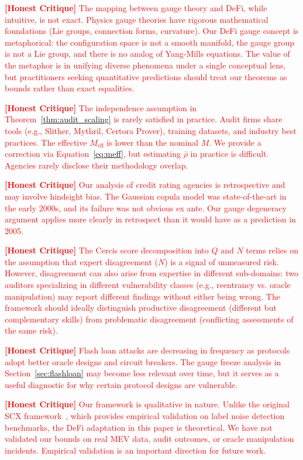 \documentclass[12pt,a4paper]{article}
\theoremstyle{remark}
\newcommand{\Cercis}{\textsf{Cercis}}
\newcommand{\honestcrit}[1]{\textcolor{red}{\textbf{[Honest Critique]} #1}}
\begin{document}
\honestcrit{The mapping between gauge theory and DeFi, while intuitive, is
not exact. Physics gauge theories have rigorous mathematical foundations
(Lie groups, connection forms, curvature). Our DeFi gauge concept is
metaphorical: the configuration space is not a smooth manifold, the gauge
group is not a Lie group, and there is no analog of Yang-Mills equations.
The value of the metaphor is in unifying diverse phenomena under a single
conceptual lens, but practitioners seeking quantitative predictions should
treat our theorems as bounds rather than exact equalities.}

\honestcrit{The independence assumption in Theorem~\ref{thm:audit_scaling} is
rarely satisfied in practice. Audit firms share tools (e.g., Slither, Mythril,
Certora Prover), training datasets, and industry best practices. The effective
$M_{\text{eff}}$ is lower than the nominal $M$. We provide a correction via
Equation~\ref{eq:meff}, but estimating $\bar{\rho}$ in practice is difficult.
Agencies rarely disclose their methodology overlap.}

\honestcrit{Our analysis of credit rating agencies is retrospective and may
involve hindsight bias. The Gaussian copula model was state-of-the-art in the
early 2000s, and its failure was not obvious ex ante. Our gauge degeneracy
argument applies more clearly in retrospect than it would have as a prediction
in 2005.}

\honestcrit{The \Cercis{} score decomposition into $Q$ and $N$ terms relies
on the assumption that expert disagreement ($N$) is a signal of unmeasured
risk. However, disagreement can also arise from expertise in different
sub-domains: two auditors specializing in different vulnerability classes
(e.g., reentrancy vs. oracle manipulation) may report different findings
without either being wrong. The framework should ideally distinguish
productive disagreement (different but complementary skills) from problematic
disagreement (conflicting assessments of the same risk).}

\honestcrit{Flash loan attacks are decreasing in frequency as protocols adopt
better oracle designs and circuit breakers. The gauge freeze analysis in
Section~\ref{sec:flashloan} may become less relevant over time, but it serves
as a useful diagnostic for why certain protocol designs are vulnerable.}

\honestcrit{Our framework is qualitative in nature. Unlike the original SCX
framework~\cite{scx2025}, which provides empirical validation on label noise
detection benchmarks, the DeFi adaptation in this paper is theoretical. We
have not validated our bounds on real MEV data, audit outcomes, or oracle
manipulation incidents. Empirical validation is an important direction for
future work.}
\end{document}
